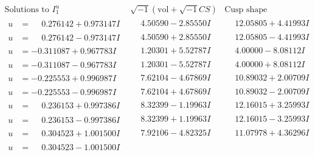 \documentclass[1p]{elsarticle_modified}
\theoremstyle{definition}
\newcommand{\I}{\sqrt{-1}}
\begin{document}
$$\begin{array}{c|c|c}  
\text{Solutions to }I^u_{1}& \I (\text{vol} + \sqrt{-1}CS) & \text{Cusp shape}\\
 \hline 
\begin{aligned}
u &= \phantom{-}0.276142 + 0.973147 I\end{aligned}
 & \phantom{-}4.50590 - 2.85550 I & \phantom{-}12.05805 + 4.41993 I \\ \hline\begin{aligned}
u &= \phantom{-}0.276142 - 0.973147 I\end{aligned}
 & \phantom{-}4.50590 + 2.85550 I & \phantom{-}12.05805 - 4.41993 I \\ \hline\begin{aligned}
u &= -0.311087 + 0.967783 I\end{aligned}
 & \phantom{-}1.20301 + 5.52787 I & \phantom{-}4.00000 - 8.08112 I \\ \hline\begin{aligned}
u &= -0.311087 - 0.967783 I\end{aligned}
 & \phantom{-}1.20301 - 5.52787 I & \phantom{-}4.00000 + 8.08112 I \\ \hline\begin{aligned}
u &= -0.225553 + 0.996987 I\end{aligned}
 & \phantom{-}7.62104 - 4.67869 I & \phantom{-}10.89032 + 2.00709 I \\ \hline\begin{aligned}
u &= -0.225553 - 0.996987 I\end{aligned}
 & \phantom{-}7.62104 + 4.67869 I & \phantom{-}10.89032 - 2.00709 I \\ \hline\begin{aligned}
u &= \phantom{-}0.236153 + 0.997386 I\end{aligned}
 & \phantom{-}8.32399 - 1.19963 I & \phantom{-}12.16015 + 3.25993 I \\ \hline\begin{aligned}
u &= \phantom{-}0.236153 - 0.997386 I\end{aligned}
 & \phantom{-}8.32399 + 1.19963 I & \phantom{-}12.16015 - 3.25993 I \\ \hline\begin{aligned}
u &= \phantom{-}0.304523 + 1.001500 I\end{aligned}
 & \phantom{-}7.92106 - 4.82325 I & \phantom{-}11.07978 + 4.36296 I \\ \hline\begin{aligned}
u &= \phantom{-}0.304523 - 1.001500 I\end{aligned}

\end{array}$$
\end{document}
